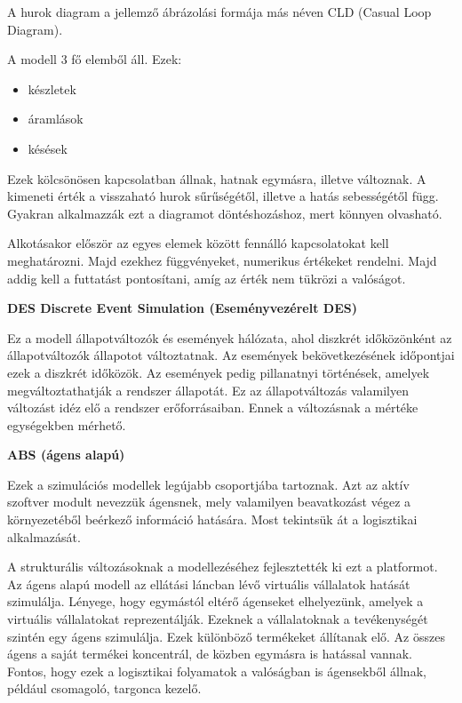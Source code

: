 A hurok diagram a jellemző ábrázolási formája más néven CLD (Casual Loop Diagram).

A modell 3 fő elemből áll.
Ezek:

\begin{itemize}
	\item készletek
	\item  áramlások
	\item  késések
\end{itemize}


Ezek kölcsönösen kapcsolatban állnak, hatnak egymásra, illetve változnak.
A kimeneti érték a visszaható hurok sűrűségétől, illetve a hatás sebességétől függ. 
Gyakran alkalmazzák ezt a diagramot döntéshozáshoz, mert könnyen olvasható.

Alkotásakor először az egyes elemek között fennálló kapcsolatokat kell meghatározni. Majd ezekhez függvényeket, numerikus értékeket rendelni. Majd addig kell a futtatást pontosítani, amíg az érték nem tükrözi a valóságot. 



\textbf{DES Discrete Event Simulation (Eseményvezérelt DES)}

Ez a modell állapotváltozók és események hálózata, ahol diszkrét időközönként az állapotváltozók állapotot változtatnak.
Az események bekövetkezésének időpontjai ezek a diszkrét időközök. Az események pedig pillanatnyi történések, amelyek megváltoztathatják a rendszer állapotát.
Ez az állapotváltozás valamilyen változást idéz elő a rendszer erőforrásaiban. Ennek a változásnak a mértéke egységekben mérhető.

\textbf{ABS (ágens alapú)}

Ezek a szimulációs modellek legújabb csoportjába tartoznak. Azt az aktív szoftver modult nevezzük ágensnek, mely valamilyen beavatkozást végez a környezetéből beérkező információ hatására. 
Most tekintsük át a logisztikai alkalmazását. 

A strukturális változásoknak a modellezéséhez fejlesztették ki ezt a platformot. Az ágens alapú modell az ellátási láncban lévő virtuális vállalatok hatását szimulálja. Lényege, hogy egymástól eltérő ágenseket elhelyezünk, amelyek a virtuális vállalatokat reprezentálják. Ezeknek a vállalatoknak a tevékenységét szintén egy ágens szimulálja. Ezek különböző termékeket állítanak elő. Az összes ágens a saját termékei koncentrál, de közben egymásra is hatással vannak. Fontos, hogy ezek a logisztikai folyamatok a valóságban is ágensekből állnak, például csomagoló, targonca kezelő. 


